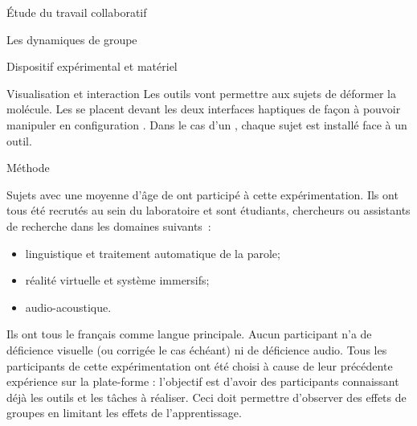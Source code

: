 \documentclass[myfrancais]{mythesis}
\begin{document}
\begin{mypart}{Étude du travail collaboratif}
\begin{mychapter}{Les dynamiques de groupe}
\begin{mysection}{Dispositif expérimental et matériel}
\begin{mysubsection}{Visualisation et interaction}
					Les outils  vont permettre aux sujets de déformer la molécule.
					Les  se placent devant les deux interfaces haptiques de façon à pouvoir manipuler en configuration .
					Dans le cas d'un , chaque sujet est installé face à un outil.
				\end{mysubsection}
			\end{mysection}
			\begin{mysection}{Méthode}
				\begin{mysubsection}[sse-exp3-Sujets]{Sujets}
					 avec une moyenne d'âge de  ont participé à cette expérimentation.
					Ils ont tous été recrutés au sein du laboratoire  et sont étudiants, chercheurs ou assistants de recherche dans les domaines suivants~:
					\begin{itemize}
						\item linguistique et traitement automatique de la parole;
						\item réalité virtuelle et système immersifs;
						\item audio-acoustique.
					\end{itemize}
					Ils ont tous le français comme langue principale.
					Aucun participant n'a de déficience visuelle (ou corrigée le cas échéant) ni de déficience audio.
					Tous les participants de cette expérimentation ont été choisi à cause de leur précédente expérience sur la plate-forme : l'objectif est d'avoir des participants connaissant déjà les outils et les tâches à réaliser.
					Ceci doit permettre d'observer des effets de groupes en limitant les effets de l'apprentissage.


\end{mysubsection}
\end{mysection}
\end{mychapter}
\end{mypart}
\end{document}
